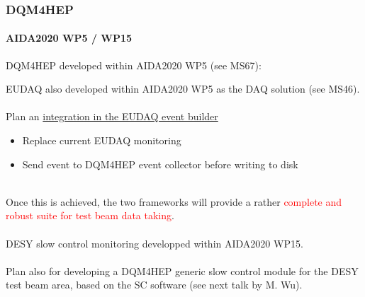 \documentclass[presentation, 10pt]{beamer}
\begin{document}
\begin{frame}
  \frametitle{DQM4HEP}
  \framesubtitle{AIDA2020 WP5 / WP15 }
  \scriptsize
  DQM4HEP developed within AIDA2020 WP5 (see MS67):
  \begin{center}
  \end{center}
  EUDAQ also developed within AIDA2020 WP5 as the DAQ solution (see MS46). \\
  ~\\
  Plan an \underline{integration in the EUDAQ event builder}
  \begin{itemize}
    \item Replace current EUDAQ monitoring
    \item Send event to DQM4HEP event collector before writing to disk
  \end{itemize}
  ~\\ 
  Once this is achieved, the two frameworks will provide a rather \textcolor{red}{complete and robust suite for test beam data taking}.\\
  ~\\
  DESY slow control monitoring developped within AIDA2020 WP15. \\
  ~\\
  Plan also for developing a DQM4HEP generic slow control module for the DESY test beam area, based on the SC software (see next talk by M. Wu).
\end{frame}
\end{document}
